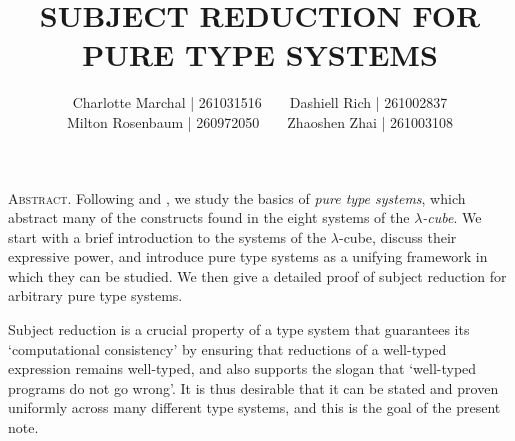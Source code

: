 \documentclass[reqno, twoside]{article}
\begin{document}
    \title{\textbf{\normalsize\MakeUppercase{Subject Reduction for Pure Type Systems}}}
    \author{\small Charlotte Marchal | 261031516\ \ \ \ Dashiell Rich | 261002837\\\small Milton Rosenbaum | 260972050\ \ \ \ Zhaoshen Zhai | 261003108}
    \date{}
    \maketitle

    \begin{center}
        \vspace{-0.3in}
        \begin{minipage}{0.85\textwidth}
            {\footnotesize{\textsc{Abstract.}} Following \cite{GN91} and \cite{Bar91}, we study the basics of \textit{pure type systems}, which abstract many of the constructs found in the eight systems of the \textit{$\lambda$-cube}. We start with a brief introduction to the systems of the $\lambda$-cube, discuss their expressive power, and introduce pure type systems as a unifying framework in which they can be studied. We then give a detailed proof of subject reduction for arbitrary pure type systems.}
        \end{minipage}
    \end{center}
    
    Subject reduction is a crucial property of a type system that guarantees its `computational consistency' by ensuring that reductions of a well-typed expression remains well-typed, and also supports the slogan that `well-typed programs do not go wrong'. It is thus desirable that it can be stated and proven uniformly across many different type systems, and this is the goal of the present note.
\end{document}
